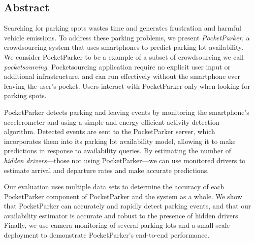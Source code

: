 \subsection*{Abstract}

Searching for parking spots wastes time and generates frustration and harmful
vehicle emissions. To address these parking problems, we present
\textit{PocketParker}, a crowdsourcing system that uses smartphones to
predict parking lot availability. We consider PocketParker to be a example of
a subset of crowdsourcing we call \textit{pocketsourcing}. Pocketsourcing
application require no explicit user input or additional infrastructure, and
can run effectively without the smartphone ever leaving the user's pocket.
Users interact with PocketParker only when looking for parking spots.

PocketParker detects parking and leaving events by monitoring the
smartphone's accelerometer and using a simple and energy-efficient activity
detection algorithm. Detected events are sent to the PocketParker server,
which incorporates them into its parking lot availability model, allowing it
to make predictions in response to availability queries. By estimating the
number of \textit{hidden drivers}---those not using PocketParker---we can use
monitored drivers to estimate arrival and departure rates and make accurate
predictions.

Our evaluation uses multiple data sets to determine the accuracy of each
PocketParker component of PocketParker and the system as a whole. We show
that PocketParker can accurately and rapidly detect parking events, and that
our availability estimator is accurate and robust to the presence of hidden
drivers. Finally, we use camera monitoring of several parking lots and a
small-scale deployment to demonstrate PocketParker's end-to-end performance. 
